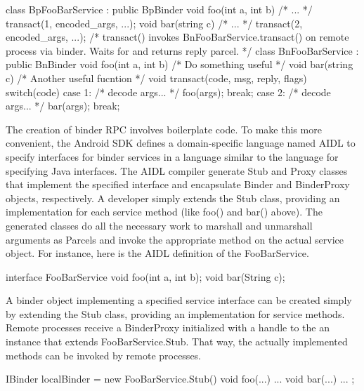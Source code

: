 \documentclass[prodmode]{acmlarge}
\begin{document}
\begin{snippet}
class BpFooBarService : public BpBinder {
  void foo(int a, int b) { /* ... */ transact(1, encoded_args, ...); }
  void bar(string c) { /* ... */ transact(2, encoded_args, ...); }
  /* transact() invokes BnFooBarService.transact() on remote process
     via binder. Waits for and returns reply parcel. */
}
class BnFooBarService : public BnBinder {
  void foo(int a, int b) { /* Do something useful */ }
  void bar(string c) { /* Another useful fucntion */ }
  void transact(code, msg, reply, flags) {
    switch(code) {
      case 1: /* decode args... */ foo(args); break;
      case 2: /* decode args... */ bar(args); break;
}}}
\end{snippet}

The creation of binder RPC involves boilerplate code. To make this more convenient, the Android SDK defines a domain-specific language named AIDL to specify interfaces for binder services in a language similar to the language for specifying Java interfaces. The AIDL compiler generate Stub and Proxy classes that implement the specified interface and encapsulate Binder and BinderProxy objects, respectively. A developer simply extends the Stub class, providing an implementation for each service method (like foo() and bar() above). The generated classes do all the necessary work to marshall and unmarshall arguments as Parcels and invoke the appropriate method on the actual service object. For instance, here is the AIDL definition of the FooBarService.

\begin{snippet}
interface FooBarService { void foo(int a, int b); void bar(String c); }
\end{snippet}

A binder object implementing a specified service interface can be created simply by extending the Stub class, providing an implementation for service methods. Remote processes receive a BinderProxy initialized with a handle to the an instance that extends FooBarService.Stub. That way, the actually implemented methods can be invoked by remote processes.

\begin{snippet}
IBinder localBinder = new FooBarService.Stub() { void foo(...) { ... }
                                                 void bar(...) { ... } };
\end{snippet}
\end{document}

